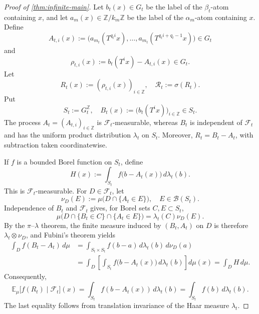 \documentclass[12pt,letterpaper,reqno]{amsart}
\newcommand{\Z}{\mathbb Z}
\newcommand{\cB}{\mathcal B}
\newcommand{\cF}{\mathcal F}
\newcommand{\cR}{\mathcal R}
\theoremstyle{definition}
\theoremstyle{remark}
\numberwithin{equation}{section}
\begin{document}
\begin{proof}[Proof of \cref{thm:infinite-main}]
		
		Let
		$b_t(x)\in G_t$ be the label of the $\beta_t$-atom containing $x$, and
		let $a_m(x)\in\Z/k_m\Z$ be the label of the $\alpha_m$-atom containing $x$.
		Define
		\[
		A_{t,i}(x)
		:=
		\bigl(
		a_{m_t}(T^{q_ti}x),\ldots,
		a_{m_t}(T^{q_ti+q_t-1}x)
		\bigr)\in G_t
		\]
		and
		\[
		\rho_{t,i}(x):=b_t(T^ix)-A_{t,i}(x)\in G_t.
		\]
		Let
		\[
		R_t(x):=(\rho_{t,i}(x))_{i\in\Z},
		\quad
		\cR_t:=\sigma(R_t).
		\]
		Put
		\[
		S_t:=G_t^\Z,
		\quad
		B_t(x):=\bigl(b_t(T^ix)\bigr)_{i\in\Z}\in S_t.
		\]
		The process $A_t=(A_{t,i})_{i\in\Z}$ is $\cF_t$-measurable, whereas
		$B_t$ is independent of $\cF_t$ and has the uniform product distribution
		$\lambda_t$ on $S_t$.  Moreover, $R_t=B_t-A_t$, with subtraction taken
		coordinatewise.
		
		If $f$ is a bounded Borel
		function on $S_t$, define
		\[
		H(x):=\int_{S_t}f\bigl(b-A_t(x)\bigr)\,d\lambda_t(b).
		\]
		This is $\cF_t$-measurable.  For $D\in\cF_t$, let
		\[
		\nu_D(E):=\mu\bigl(D\cap\{A_t\in E\}\bigr),
		\quad E\in\cB(S_t).
		\]
		Independence of $B_t$ and $\cF_t$ gives, for Borel sets $C,E\subset S_t$,
		\[
		\mu\bigl(D\cap\{B_t\in C\}\cap\{A_t\in E\}\bigr)
		=
		\lambda_t(C)\nu_D(E).
		\]
		By the $\pi$--$\lambda$ theorem, the finite measure induced by
		$(B_t,A_t)$ on $D$ is therefore $\lambda_t\otimes\nu_D$, and Fubini's
		theorem yields
		\[
		\begin{aligned}
			\int_D f(B_t-A_t)\,d\mu
			&=
			\int_{S_t\times S_t}f(b-a)\,d\lambda_t(b)\,d\nu_D(a)\\
			&=
			\int_D\left[\int_{S_t}f\bigl(b-A_t(x)\bigr)\,d\lambda_t(b)\right]d\mu(x)
			=
			\int_DH\,d\mu.
		\end{aligned}
		\]
		Consequently,
		\[
		\mathbb E_\mu\bigl[f(R_t)\mid\cF_t\bigr](x)
		=
		\int_{S_t} f(b-A_t(x))\,d\lambda_t(b)
		=
		\int_{S_t} f(b)\,d\lambda_t(b).
		\]
		The last equality follows from translation invariance of the Haar
		measure $\lambda_t$.
		

\end{proof}
\end{document}
